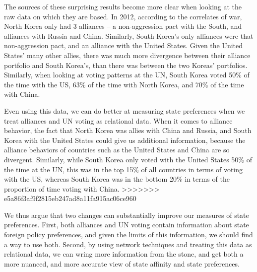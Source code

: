 The sources of these surprising results become more clear when looking at the raw data on which they are based. In 2012, according to the correlates of war, North Korea only had 3 alliances -- a non-aggression pact with the South, and alliances with Russia and China. Similarly, South Korea's only alliances were that non-aggression pact, and an alliance with the United States. Given the United States' many other allies, there was much more divergence between their alliance portfolio and South Korea's, than there was between the two Koreas' portfolios. Similarly, when looking at voting patterns at the UN, South Korea voted 50\% of the time with the US, 63\% of the time with North Korea, and 70\% of the time with China.

Even using this data, we can do better at measuring state preferences when we treat alliances and UN voting as relational data. When it comes to alliance behavior, the fact that North Korea was allies with China and Russia, and South Korea with the United States could give us additional information, because the alliance behaviors of countries such as the United States and China are so divergent. Similarly, while South Korea only voted with the United States 50\% of the time at the UN, this was in the top 15\% of all countries in terms of voting with the US, whereas South Korea was in the bottom 20\% in terms of the proportion of time voting with China.
>>>>>>> e5a86f3af9f2815eb247ad8a11fa915ac06ce960

We thus argue that two changes can substantially improve our measures of state preferences. First, both alliances and UN voting contain information about state foreign policy preferences, and given the limits of this information, we should find a way to use both. Second, by using network techniques and treating this data as relational data, we can wring more information from the stone, and get both a more nuanced, and more accurate view of state affinity and state preferences.